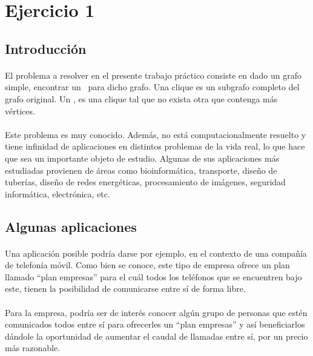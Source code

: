 \section{Ejercicio 1}
\subsection{Introducción}

\paragraph{}
El problema a resolver en el presente trabajo práctico consiste en dado un grafo simple, encontrar un \mc \ para dicho grafo. Una clique es un subgrafo completo del grafo original. Un \mc, es una clique tal que no exista otra que contenga más vértices.

\paragraph{}
Este problema es muy conocido. Además, no está computacionalmente resuelto  y tiene infinidad de aplicaciones en distintos problemas de la vida real, lo que hace que sea un importante objeto de estudio. Algunas de sus aplicaciones más estudiadas provienen de áreas como bioinformática, transporte, diseño de tuberías, diseño de redes energéticas, procesamiento de imágenes, seguridad informática, electrónica, etc.

\subsection{Algunas aplicaciones}

\paragraph{}
Una aplicación posible podría darse por ejemplo, en el contexto de una compañía de telefonía móvil. Como bien se conoce, este tipo de empresa ofrece un plan llamado ``plan empresas'' para el cuál todos los teléfonos que se encuentren bajo este, tienen la posibilidad de comunicarse entre sí de forma libre.

\paragraph{}
Para la empresa, podría ser de interés conocer algún grupo de personas que estén comunicados todos entre sí para ofrecerles un ``plan empresas'' y así beneficiarlos dándole la oportunidad de aumentar el caudal de llamadas entre sí, por un precio más razonable.

